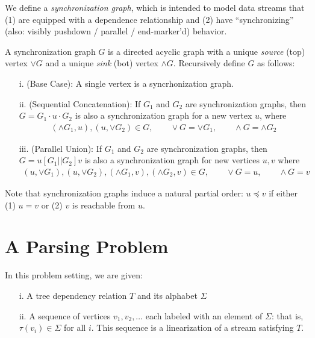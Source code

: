 \documentclass[12pt]{article}
\begin{document}
We define a \textit{synchronization graph},
which is intended to model data streams that
(1) are equipped with a dependence relationship
and (2) have ``synchronizing''
(also: visibly pushdown / parallel / end-marker'd) behavior.

\begin{definition}
  A synchronization graph \(G\) is a directed acyclic graph
  with a unique \textit{source} (top) vertex \(\vee G\)
  and a unique \textit{sink} (bot) vertex \(\wedge G\).
  Recursively define \(G\) as follows:
  \begin{enumerate}
    \item[i.] (Base Case):
      A single vertex is a syncrhonization graph.

    \item[ii.] (Sequential Concatenation):
      If \(G_1\) and \(G_2\) are synchronization graphs,
      then \(G = G_1 \cdot u \cdot G_2\) is also a synchronization graph
      for a new vertex \(u\), where
      \begin{align*}
        (\wedge G_1, u), (u, \vee G_2) \in G,
        \qquad \vee G = \vee G_1,
        \qquad \wedge G = \wedge G_2
      \end{align*}


    \item[iii.] (Parallel Union):
      If \(G_1\) and \(G_2\) are synchronization graphs,
      then \(G = u [ G_1 || G_2 ] v\) is also a synchronization graph
      for new vertices \(u, v\) where
      \begin{align*}
        (u, \vee G_1), (u, \vee G_2),
        (\wedge G_1, v), (\wedge G_2, v) \in G,
          \qquad \vee G = u,
          \qquad \wedge G = v
      \end{align*}

  \end{enumerate}
\end{definition}

Note that synchronization graphs induce a natural partial order:
\(u \preceq v\) if either (1) \(u = v\) or (2) \(v\) is reachable from \(u\).


\section{A Parsing Problem}
In this problem setting, we are given:
\begin{enumerate}
  \item[i.] A tree dependency relation \(T\) and its alphabet \(\Sigma\)

  \item[ii.]
    A sequence of vertices \(v_1, v_2, \ldots\)
    each labeled with an element of \(\Sigma\):
    that is, \(\tau(v_i) \in \Sigma\) for all \(i\).
    This sequence is a linearization of a stream satisfying \(T\).

\end{enumerate}
\end{document}

